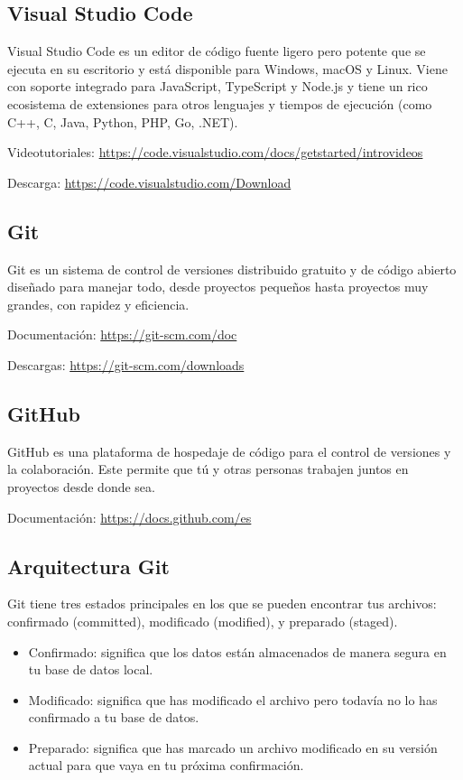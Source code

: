 \documentclass{article}
\begin{document}
\subsection{Visual Studio Code}
Visual Studio Code es un editor de código fuente ligero pero potente que se ejecuta en su escritorio y está disponible para Windows, macOS y Linux. Viene con soporte integrado para JavaScript, TypeScript y Node.js y tiene un rico ecosistema de extensiones para otros lenguajes y tiempos de ejecución (como C++, C, Java, Python, PHP, Go, .NET).

Videotutoriales: \url{https://code.visualstudio.com/docs/getstarted/introvideos}

Descarga: \url{https://code.visualstudio.com/Download}

\subsection{Git}
Git es un sistema de control de versiones distribuido gratuito y de código abierto diseñado para manejar todo, desde proyectos pequeños hasta proyectos muy grandes, con rapidez y eficiencia.

Documentación: \url{https://git-scm.com/doc}

Descargas: \url{https://git-scm.com/downloads}

\subsection{GitHub}
GitHub es una plataforma de hospedaje de código para el control de versiones y la colaboración. Este permite que tú y otras personas trabajen juntos en proyectos desde donde sea.

Documentación: \url{https://docs.github.com/es}

\subsection{Arquitectura Git}


Git tiene tres estados principales en los que se pueden encontrar tus archivos: confirmado (committed), modificado (modified), y preparado (staged).
\begin{itemize}
    \item Confirmado: significa que los datos están almacenados de manera segura en tu base de datos local.
    \item Modificado: significa que has modificado el archivo pero todavía no lo has confirmado a tu base de datos.
    \item Preparado: significa que has marcado un archivo modificado en su versión actual para que vaya en tu próxima confirmación.
\end{itemize}
\end{document}
